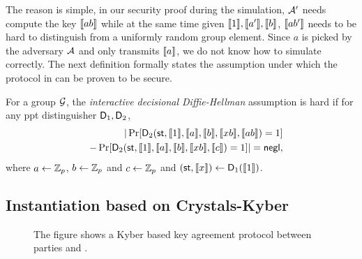 The reason is simple, in our security proof during the simulation, $\mathcal{A}'$ needs compute the key $\llbracket ab \rrbracket$ while at the same time given $\llbracket 1\rrbracket,\llbracket a'\rrbracket,\llbracket b\rrbracket$, $\llbracket ab'\rrbracket$ needs to be hard to distinguish from a uniformly random group element. Since $a$ is picked by the adversary $\mathcal{A}$ and only transmits $\llbracket a \rrbracket$, we do not know how to simulate correctly. The next definition formally states the assumption under which the protocol in  can be proven to be secure. 

\begin{definition}
For a group $\mathcal{G}$, the \emph{interactive decisional Diffie-Hellman} assumption is hard if for any ppt distinguisher $\mathsf D_1,\mathsf D_2$,
\begin{eqnarray*}
&&|\Pr[ \mathsf D_2(\mathsf{st},\llbracket 1\rrbracket,\llbracket a\rrbracket,\llbracket b\rrbracket,\llbracket xb\rrbracket,\llbracket ab\rrbracket)=1]\\
&&-\Pr[ \mathsf D_2(\mathsf{st},\llbracket 1\rrbracket,\llbracket a\rrbracket,\llbracket b\rrbracket,\llbracket xb\rrbracket,\llbracket c\rrbracket)=1]|=\mathsf{negl},
\end{eqnarray*}
where $a\leftarrow\mathbb Z_p$, $b\leftarrow\mathbb Z_p$ and $c\leftarrow\mathbb Z_p$ and $(\mathsf{st},\llbracket x\rrbracket)\leftarrow\mathsf D_1(\llbracket 1\rrbracket)$.
\end{definition}

\subsection{Instantiation based on Crystals-Kyber}
 

\begin{figure}[h!]
\centering
{}
\label{fig:Kyber}
\caption{The figure shows a Kyber based key agreement protocol between parties \A and \B.}
\end{figure}

